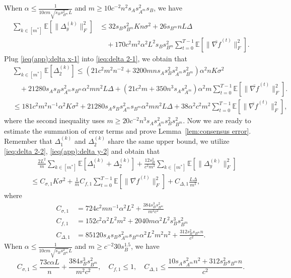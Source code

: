 \documentclass[10pt]{article}
\newcommand{\EE}{\mathbb{E}}
\newcommand{\norm}[1]{\| #1 \|}
\begin{document}
When $\alpha \le \frac{1}{10cm\sqrt{s_Bs_{B^m}^2}L}$ and $m\ge 10c^{-2}n^2s_As_{A^m}^2s_B$, we have
\begin{align}\label{ieq(app):delta y-2}
    \sum_{k\in[m^*]}\EE[\norm{\Delta_y^{(k)}}_F^2]&\le 32s_Bs_{B^m}^2Kn\sigma^2+26s_{B^m}nL\Delta\\
    &\quad+170 c^2m^2\alpha^2L^2s_Bs_{B^m}^2\sum_{t=0}^{T-1}\EE[\norm{\overline{\nabla f}^{(t)}}_F^2].\nonumber
\end{align}
Plug \eqref{ieq(app):delta x-1} into \eqref{ieq:delta 2-1}, we obtain that
\begin{align}\label{ieq:delta 2-2}
    &\sum_{k\in [m^*]}\EE[\Delta_2^{(k)}] \le (21c^2m^2n^{-2}+3200mns_As_B^2s_{A^m}^2s_{B^m}^2)\alpha^2nK\sigma^2\\
    &\quad+ 21280 s_As_Bs_{A^m}^2s_{B^m}\alpha^2mn^2L\Delta+(21c^2m+350n^3s_As_{A^m}^2)\alpha^2m\sum_{t=0}^{T-1}\EE[\norm{\overline{\nabla f}^{(t)}}_F^2].\nonumber\\
    &\le 181c^2m^2n^{-1}\alpha^2K\sigma^2 + 21280 s_As_Bs_{A^m}^2s_{B^m}\alpha^2mn^2L\Delta +38\alpha^2c^2m^2 \sum_{t=0}^{T-1}\EE[\norm{\overline{\nabla f}^{(t)}}_F^2],\nonumber
\end{align}
where the second inequality uses $m\ge 20c^{-2}n^3s_As_{A^m}^2s_B^2s_{B^m}^2$. Now we are ready to estimate the summation of error terms and prove Lemma~\ref{lem:consensus error}. 
Remember that $\Delta_1^{(k)}$ and $\Delta_2^{(k)}$ share the same upper bound, we utilize \eqref{ieq:delta 2-2}, \eqref{ieq(app):delta y-2} and obtain that
\begin{align*}
    &\quad\frac{2 L^2}{m}\sum_{k\in [m^*]}\EE[\Delta_1^{(k)}+\Delta_2^{(k)}]+ \frac{12 s_B^2}{c^2m^2}\sum_{k\in[m^*]}\EE[\norm{\Delta_y^{(k)}}_F^2]\\
    &\le C_{\sigma,1}  K\sigma^2+\frac{1}{m}C_{f,1}\sum_{t=0}^{T-1}\EE[\norm{\overline{\nabla f}^{(t)}}_F^2]+ C_{\Delta,1}\frac{ L\Delta}{m^2} \nonumber, 
\end{align*}
where
\begin{align*}
    C_{\sigma,1}&=724c^2mn^{-1}\alpha^2L^2+\frac{384s_B^3s_{B^m}^2}{m^2c^2}\\
    C_{f,1}&=152c^2\alpha^2L^2m^2+2040m\alpha^2L^2s_B^3s_{B^m}^2 \\
    C_{\Delta,1}&=85120 s_As_Bs_{A^m}^2s_{B^m}\alpha^2L^2m^2n^2+\frac{312s_B^2s_{B^m}n}{c^2}.
\end{align*}
When $\alpha \le \frac{1}{10cm\sqrt{s_Bs_{B^m}^2}L}$ and $m\ge c^{-2}30s_B^{1.5}$, we have 
\begin{equation}\label{eq:coefficients}
    C_{\sigma,1}\le \frac{73 c\alpha L}{n}+\frac{384s_B^3s_{B^m}^2}{m^2c^2}, \quad C_{f,1}\le 1, \quad C_{\Delta,1}\le \frac{10s_As_{A^m}^2n^2+312s_B^2s_{B^m}n}{c^2}.
\end{equation}
\end{document}
